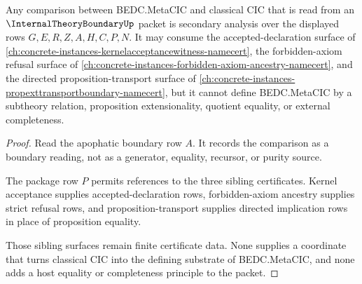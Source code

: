 \begin{theorem}
\label{thm:internal-theory-boundary-comparison-secondary}
Any comparison between BEDC.MetaCIC and classical CIC that is read from an $\InternalTheoryBoundaryUp$ packet is secondary analysis over the displayed rows $G,E,R,Z,A,H,C,P,N$. It may consume the accepted-declaration surface of \autoref{ch:concrete-instances-kernelacceptancewitness-namecert}, the forbidden-axiom refusal surface of \autoref{ch:concrete-instances-forbidden-axiom-ancestry-namecert}, and the directed proposition-transport surface of \autoref{ch:concrete-instances-propexttransportboundary-namecert}, but it cannot define BEDC.MetaCIC by a subtheory relation, proposition extensionality, quotient equality, or external completeness.
\end{theorem}
\begin{proof}
Read the apophatic boundary row $A$. It records the comparison as a boundary reading, not as a generator, equality, recursor, or purity source.

The package row $P$ permits references to the three sibling certificates. Kernel acceptance supplies accepted-declaration rows, forbidden-axiom ancestry supplies strict refusal rows, and proposition-transport supplies directed implication rows in place of proposition equality.

Those sibling surfaces remain finite certificate data. None supplies a coordinate that turns classical CIC into the defining substrate of BEDC.MetaCIC, and none adds a host equality or completeness principle to the packet.
\end{proof}

